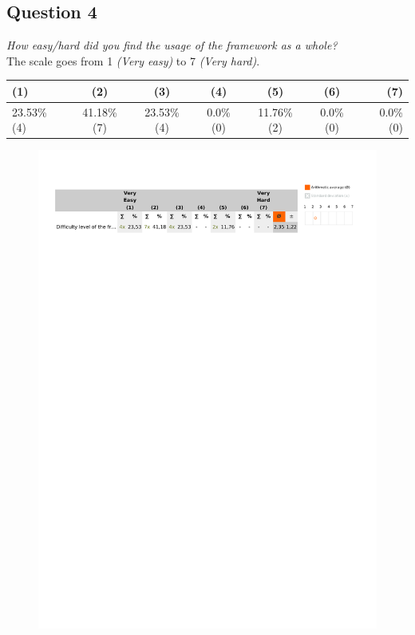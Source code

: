 \subsection{Question 4}\label{question2:4}
\emph{How easy/hard did you find the usage of the framework as a whole?}\\

The scale goes from 1 \emph{(Very easy)} to 7 \emph{(Very hard)}.
\begin{table}[H]
	\begin{center}
		\small \begin{tabular*}{1.15\columnwidth}{lcccccr}
			\\ \hline \hline
			(1) & (2) & (3) & (4) & (5) & (6) & (7) \\ \hline \hline

		 	23.53\% (4) & 41.18\% (7) & 23.53\% (4) & 0.0\% (0) & 11.76\% (2) & 0.0\% (0) & 0.0\% (0)\\ \hline
		\end{tabular*}
	\end{center}
\end{table}

\begin{figure}[H]
	\centering
	\includegraphics[width=0.6\linewidth]{gfx/Chapter_EvaluationResults/ChildproofTask/question4}
\end{figure}

